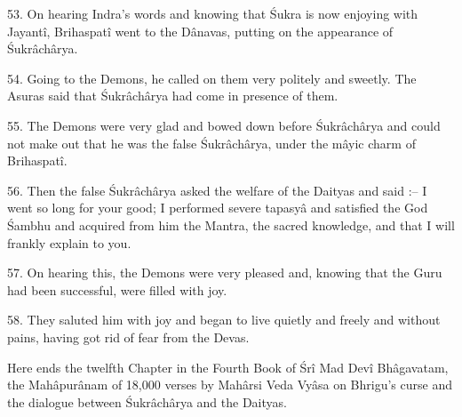 53. On hearing Indra's words and knowing that \'Sukra is now enjoying with Jayant\^i, Brihaspat\^i went to the D\^anavas, putting on the appearance of \'Sukr\^ach\^arya.

54. Going to the Demons, he called on them very politely and sweetly. The Asuras said that \'Sukr\^ach\^arya had come in presence of them.

55. The Demons were very glad and bowed down before \'Sukr\^ach\^arya and could not make out that he was the false \'Sukr\^ach\^arya, under the m\^ayic charm of Brihaspat\^i.

56. Then the false \'Sukr\^ach\^arya asked the welfare of the Daityas and said :-- I went so long for your good; I performed severe tapasy\^a and satisfied the God \'Sambhu and acquired from him the Mantra, the sacred knowledge, and that I will frankly explain to you.

57. On hearing this, the Demons were very pleased and, knowing that the Guru had been successful, were filled with joy.

58. They saluted him with joy and began to live quietly and freely and without pains, having got rid of fear from the Devas.

Here ends the twelfth Chapter in the Fourth Book of \'Sr\^i Mad Dev\^i Bh\^agavatam, the Mah\^apur\^anam of 18,000 verses by Mah\^arsi Veda Vy\^asa on Bhrigu's curse and the dialogue between \'Sukr\^ach\^arya and the Daityas.